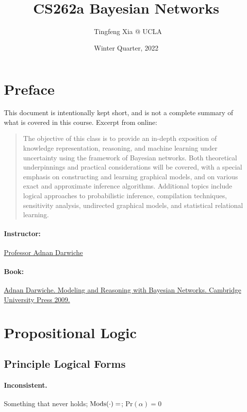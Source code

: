 \documentclass[11pt]{article}
\author{\ccLogo\, Tingfeng Xia @ UCLA}
\title{CS262a Bayesian Networks}
\date{Winter Quarter, 2022}
\newcommand{\mods}{\mathrm{Mods}}
\newcommand{\pr}{\mathrm{Pr}}
\begin{document}
\maketitle
\doclicenseThis

\section*{Preface}
This document is intentionally kept short, and is not a complete summary of what is covered in this course. Excerpt from online: 
\begin{quotation}
\noindent The objective of this class is to provide an in-depth exposition of knowledge representation, reasoning, and machine learning under uncertainty using the framework of Bayesian networks. Both theoretical underpinnings and practical considerations will be covered, with a special emphasis on constructing and learning graphical models, and on various exact and approximate inference algorithms. Additional topics include logical approaches to probabilistic inference, compilation techniques, sensitivity analysis, undirected graphical models, and statistical relational learning.
\end{quotation}

\paragraph{Instructor:} \href{https://web.cs.ucla.edu/~darwiche/}{Professor Adnan Darwiche}
\paragraph{Book:} \href{https://www.cambridge.org/us/catalogue/catalogue.asp?isbn=9780521884389}{Adnan Darwiche. Modeling and Reasoning with Bayesian Networks. Cambridge University Press 2009.}

\tableofcontents

\newpage
\section{Propositional Logic}
\subsection{Principle Logical Forms}
\paragraph{Inconsistent.} Something that never holds; $\mods (\cdot) = \empty$; $\pr(\alpha) = 0$
\end{document}
